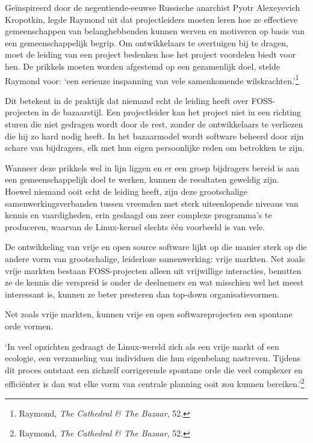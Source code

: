 \documentclass[
  a5paper,
  smalldemyvopaper,11pt,twoside,onecolumn,openright,extrafontsizes,
hidelinks]{memoir}
\renewenvironment{quote}%
               {\list{}{\rightmargin=.3cm\leftmargin=.3cm}%
                \itshape \item[]}%
               {\endlist}
\begin{document}
Geïnspireerd door de negentiende-eeuwse Russische anarchist Pyotr
Alexeyevich Kropotkin, legde Raymond uit dat projectleiders moeten leren
hoe ze effectieve gemeenschappen van belanghebbenden kunnen werven en
motiveren op basis van een gemeenschappelijk begrip. Om ontwikkelaars te
overtuigen bij te dragen, moet de leiding van een project bedenken hoe
het project voordelen biedt voor hen. De prikkels moeten worden
afgestemd op een gezamenlijk doel, stelde Raymond voor: `een serieuze
inspanning van vele samenkomende wilskrachten.'\footnote{\hspace{0pt}Raymond,
  \emph{The Cathedral \& The Bazaar}, 52.}

Dit betekent in de praktijk dat niemand echt de leiding heeft over
FOSS-projecten in de bazaarstijl. Een projectleider kan het project niet
in een richting sturen die niet gedragen wordt door de rest, zonder de
ontwikkelaars te verliezen die hij zo hard nodig heeft. In het
bazaarmodel wordt software beheerd door zijn schare van bijdragers, elk
met hun eigen persoonlijke reden om betrokken te zijn.

Wanneer deze prikkels wel in lijn liggen en er een groep bijdragers
bereid is aan een gemeenschappelijk doel te werken, kunnen de resultaten
geweldig zijn. Hoewel niemand ooit echt de leiding heeft, zijn deze
grootschalige samenwerkingsverbanden tussen vreemden met sterk
uiteenlopende niveaus van kennis en vaardigheden, erin geslaagd om zeer
complexe programma's te produceren, waarvan de Linux-kernel slechts één
voorbeeld is van vele.

De ontwikkeling van vrije en open source software lijkt op die manier
sterk op die andere vorm van grootschalige, leiderloze samenwerking:
vrije markten. Net zoals vrije markten bestaan FOSS-projecten alleen uit
vrijwillige interacties, benutten ze de kennis die verspreid is onder de
deelnemers en wat misschien wel het meest interessant is, kunnen ze
beter presteren dan top-down organisatievormen.

Net zoals vrije markten, kunnen vrije en open softwareprojecten een
spontane orde vormen.

\begin{quote}
`In veel opzichten gedraagt de Linux-wereld zich als een vrije markt of
een ecologie, een verzameling van individuen die hun eigenbelang
nastreven. Tijdens dit proces ontstaat een zichzelf corrigerende
spontane orde die veel complexer en efficiënter is dan wat elke vorm van
centrale planning ooit zou kunnen bereiken.'\footnote{\hspace{0pt}Raymond,
  \emph{The Cathedral \& The Bazaar}, 52.}
\end{quote}
\end{document}
